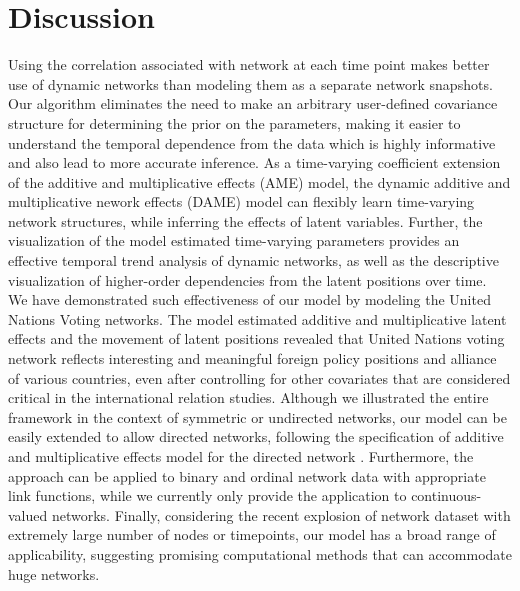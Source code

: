 \documentclass[a4paper]{article}
\begin{document}
\section{Discussion}
Using the correlation associated with network at each time point makes better use of dynamic networks than modeling them as a separate network snapshots. Our algorithm eliminates the need to make an arbitrary user-defined covariance structure for determining the prior on the parameters, making it easier to understand the temporal dependence from the data which is  highly informative and also lead to more accurate inference.  As a time-varying coefficient extension of the additive and multiplicative effects (AME) model, the dynamic additive and multiplicative nework effects (DAME) model can flexibly learn time-varying network structures, while inferring the effects of latent variables. Further, the visualization of the model estimated time-varying parameters provides an effective temporal trend analysis of dynamic networks, as well as the descriptive visualization of higher-order dependencies from the latent positions over time.
\\\newline
We have demonstrated such effectiveness of our model by modeling the United Nations Voting networks. The model estimated additive and multiplicative latent effects and the movement of latent positions revealed that United Nations voting network reflects interesting and meaningful foreign policy positions and alliance of various countries, even after controlling for other covariates that are considered critical in the international relation studies. Although we illustrated the entire framework in the context of symmetric or undirected networks, our model can be easily extended to allow directed networks, following the specification of additive and multiplicative effects model for the directed network \citep{minhas2016inferential}. Furthermore, the approach can be applied to binary and ordinal network data with appropriate link functions, while we currently only provide the application to continuous-valued networks.  Finally, considering the recent explosion of network dataset with extremely large number of nodes or timepoints, our model has a broad range of applicability, suggesting promising computational methods that can accommodate huge networks.


\newpage
\end{document}
